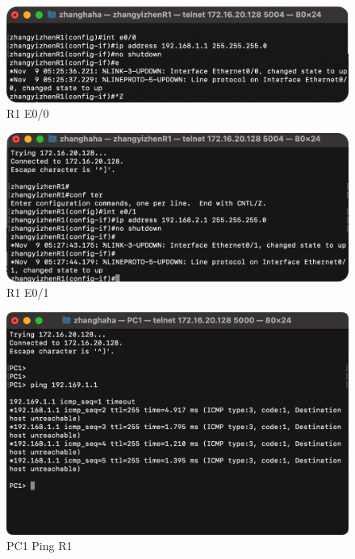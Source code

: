\documentclass[a4paper,12pt]{report}
\begin{document}
\begin{spacing}{1.5}
\begin{figure}[htb!]
  \centering
\includegraphics[width=12cm]{figure/r1e00.png}
\caption{R1 E0/0}
\label{7}
\end{figure}
\begin{figure}[htb!]
  \centering
\includegraphics[width=12cm]{figure/r1e01.png}
\caption{R1 E0/1}
\label{8}
\end{figure}
\begin{figure}[htb!]
  \centering
\includegraphics[width=12cm]{figure/pc1pingr1.png}
\caption{PC1 Ping R1}
\label{9}
\end{figure}


\end{spacing}
\end{document}
